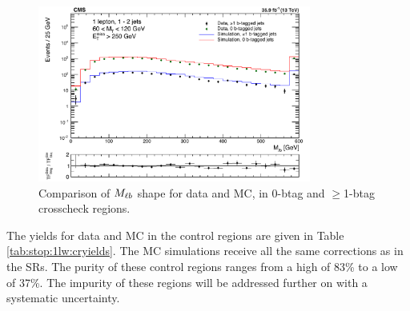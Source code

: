 \begin{figure}[htbp]
\centering
\includegraphics[width=0.8\textwidth]{figures/cr0b_Mlbshape_crosscheck.pdf}
\caption{Comparison of $M_{\ell b}$ shape for data and MC, in 0-btag
  and $\geq$1-btag crosscheck regions.}
\label{fig:stop:1lw:mlbxcheck}
\end{figure}

The yields for data and MC in the control regions are given in Table
\ref{tab:stop:1lw:cryields}. The MC simulations receive all the same
corrections as in the SRs. The purity of these control regions ranges
from a high of 83\% to a low of 37\%. The impurity of these regions
will be addressed further on with a systematic uncertainty.

